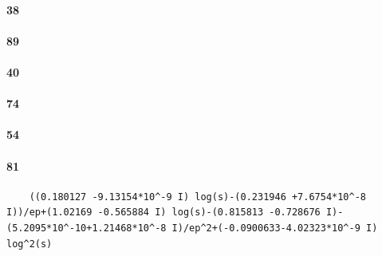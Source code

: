 \documentclass{article}
\begin{document}
\paragraph{38}
\paragraph{89}
\paragraph{40}
\paragraph{74}
\paragraph{54}
\paragraph{81}
\begin{verbatim}
	((0.180127 -9.13154*10^-9 I) log(s)-(0.231946 +7.6754*10^-8 I))/ep+(1.02169 -0.565884 I) log(s)-(0.815813 -0.728676 I)-(5.2095*10^-10+1.21468*10^-8 I)/ep^2+(-0.0900633-4.02323*10^-9 I) log^2(s)
\end{verbatim}
\end{document}
